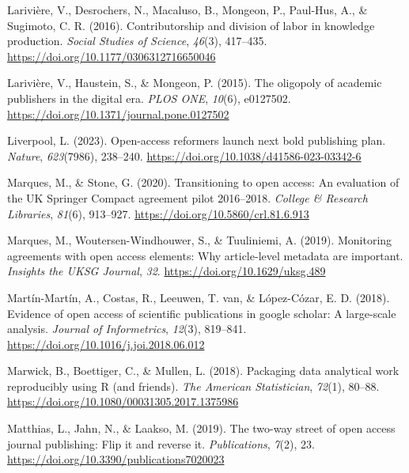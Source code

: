 \documentclass[a4paper,man,floatsintext,longtable,noextraspace,12pt]{apa6}
\newenvironment{CSLReferences}%
  {}%
  {\par}
\begin{document}
\begin{CSLReferences}{1}{0}
\leavevmode{}%
Larivière, V., Desrochers, N., Macaluso, B., Mongeon, P., Paul-Hus, A.,
\& Sugimoto, C. R. (2016). Contributorship and division of labor in
knowledge production. \emph{Social Studies of Science}, \emph{46}(3),
417--435. \url{https://doi.org/10.1177/0306312716650046}

\leavevmode{}%
Larivière, V., Haustein, S., \& Mongeon, P. (2015). The oligopoly of
academic publishers in the digital era. \emph{{PLOS} {ONE}},
\emph{10}(6), e0127502.
\url{https://doi.org/10.1371/journal.pone.0127502}

\leavevmode{}%
Liverpool, L. (2023). Open-access reformers launch next bold publishing
plan. \emph{Nature}, \emph{623}(7986), 238--240.
\url{https://doi.org/10.1038/d41586-023-03342-6}

\leavevmode{}%
Marques, M., \& Stone, G. (2020). Transitioning to open access: An
evaluation of the {UK} {Springer Compact} agreement pilot 2016--2018.
\emph{College {\&} Research Libraries}, \emph{81}(6), 913--927.
\url{https://doi.org/10.5860/crl.81.6.913}

\leavevmode{}%
Marques, M., Woutersen-Windhouwer, S., \& Tuuliniemi, A. (2019).
Monitoring agreements with open access elements: Why article-level
metadata are important. \emph{Insights the {UKSG} Journal}, \emph{32}.
\url{https://doi.org/10.1629/uksg.489}

\leavevmode{}%
Martín-Martín, A., Costas, R., Leeuwen, T. van, \& López-Cózar, E. D.
(2018). Evidence of open access of scientific publications in google
scholar: A large-scale analysis. \emph{Journal of Informetrics},
\emph{12}(3), 819--841. \url{https://doi.org/10.1016/j.joi.2018.06.012}

\leavevmode{}%
Marwick, B., Boettiger, C., \& Mullen, L. (2018). Packaging data
analytical work reproducibly using {R} (and friends). \emph{The American
Statistician}, \emph{72}(1), 80--88.
\url{https://doi.org/10.1080/00031305.2017.1375986}

\leavevmode{}%
Matthias, L., Jahn, N., \& Laakso, M. (2019). The two-way street of open
access journal publishing: Flip it and reverse it. \emph{Publications},
\emph{7}(2), 23. \url{https://doi.org/10.3390/publications7020023}


\end{CSLReferences}
\end{document}
